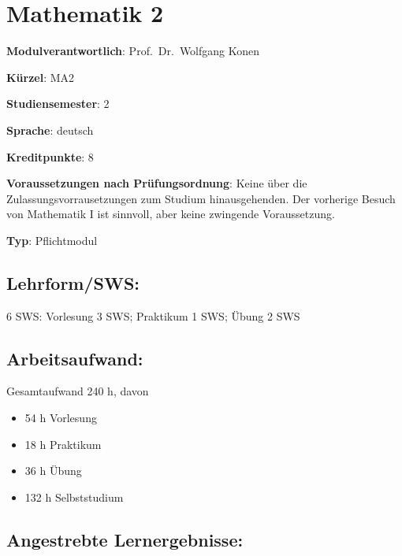 \chapter{Mathematik 2}\label{mathematik-2}

\begin{modulHead}
\textbf{Modulverantwortlich}: Prof.~Dr.~Wolfgang
Konen
\end{modulHead}
\begin{modulHead}
\textbf{Kürzel}:
MA2
\end{modulHead}
\begin{modulHead}
\textbf{Studiensemester}:
2
\end{modulHead}
\begin{modulHead}
\textbf{Sprache}:
deutsch
\end{modulHead}
\begin{modulHead}
\textbf{Kreditpunkte}:
8
\end{modulHead}
\begin{modulHead}
\textbf{Voraussetzungen nach
Prüfungsordnung}: Keine über die Zulassungsvorrausetzungen zum Studium
hinausgehenden. Der vorherige Besuch von Mathematik I ist sinnvoll, aber
keine zwingende
Voraussetzung.
\end{modulHead}
\begin{modulHead}
\textbf{Typ}:
Pflichtmodul
\end{modulHead}


\section*{Lehrform/SWS:}\label{lehrformsws-14}

6 SWS: Vorlesung 3 SWS; Praktikum 1 SWS; Übung 2 SWS

\section*{Arbeitsaufwand:}\label{arbeitsaufwand-13}

Gesamtaufwand 240 h, davon

\begin{itemize}
\tightlist
\item
  54 h Vorlesung
\item
  18 h Praktikum
\item
  36 h Übung
\item
  132 h Selbststudium
\end{itemize}

\section*{Angestrebte
Lernergebnisse:}\label{angestrebte-lernergebnisse-14}

